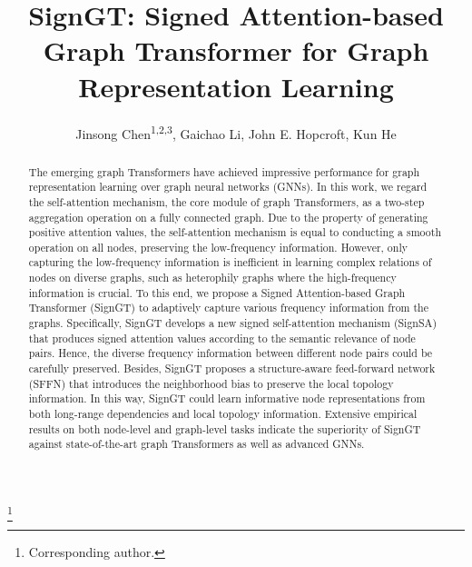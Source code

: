 \documentclass[sigconf, screen]{acmart}
\begin{document}
\title{SignGT: Signed Attention-based Graph Transformer for Graph Representation Learning}

\author{Jinsong Chen\textsuperscript{1,2,3}, Gaichao Li, John E. Hopcroft, Kun He}

\thanks{ Corresponding author.}

\def\authors{Jinsong Chen, Gaichao Li, John E. Hopcroft, Kun He}

\renewcommand{\shortauthors}{Chen, et al.}

\begin{abstract}
The emerging graph Transformers have achieved impressive performance for graph representation learning over graph neural networks (GNNs). In this work, we regard the self-attention mechanism,  the core module of graph Transformers, as a two-step aggregation operation on a fully connected graph. Due to the property of generating positive attention values, the self-attention mechanism is equal to conducting a smooth operation on all nodes, preserving the low-frequency information. However, only capturing the low-frequency information is inefficient in learning complex relations of nodes on diverse graphs, such as heterophily graphs where the high-frequency information is crucial. To this end, we propose a Signed Attention-based Graph Transformer (SignGT) to adaptively capture various frequency information from the graphs. Specifically, SignGT develops a new signed self-attention mechanism (SignSA) that produces signed attention values according to the semantic relevance of node pairs. Hence, the diverse frequency information between different node pairs could be carefully preserved. Besides, SignGT proposes a structure-aware feed-forward network (SFFN) that introduces the neighborhood bias to preserve the local topology information. In this way, SignGT could learn informative node representations from both long-range dependencies and local topology information. Extensive empirical results on both node-level and graph-level tasks indicate the superiority of SignGT against state-of-the-art graph Transformers as well as advanced GNNs.
\end{abstract}
\end{document}
